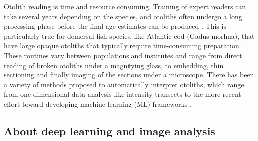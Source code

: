 \documentclass[10pt,letterpaper]{article}
\begin{document}
Otolith reading is time and resource consuming. Training of expert readers can take several years depending on the species, and otoliths often undergo a long processing phase before the final age estimates can be produced \citep{Carbonara}. This is particularly true for demersal fish species, like Atlantic cod (Gadus morhua), that have large opaque otoliths that typically require time-consuming preparation. These routines vary between populations and institutes and range from direct reading of broken otoliths under a magnifying glass, to embedding, thin sectioning and finally imaging of the sections under a microscope. There has been a variety of methods proposed to automatically interpret otoliths, which range from one-dimensional data analysis like intensity transects \citep{Mahe} to the more recent effort toward developing machine learning (ML) frameworks \citep{moenetal, Politikos}. 

\subsection*{About deep learning and image analysis}
\end{document}
